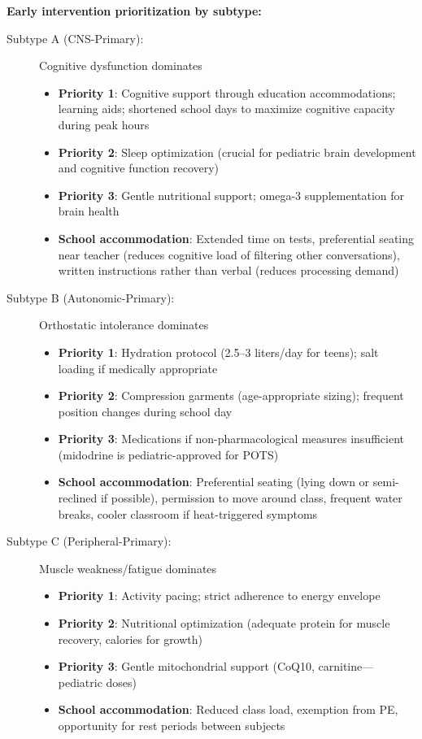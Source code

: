 \begin{recommendation}
\textbf{Early intervention prioritization by subtype:}

\begin{description}
    \item[Subtype A (CNS-Primary):] Cognitive dysfunction dominates
    \begin{itemize}
        \item \textbf{Priority 1}: Cognitive support through education accommodations; learning aids; shortened school days to maximize cognitive capacity during peak hours
        \item \textbf{Priority 2}: Sleep optimization (crucial for pediatric brain development and cognitive function recovery)
        \item \textbf{Priority 3}: Gentle nutritional support; omega-3 supplementation for brain health
        \item \textbf{School accommodation}: Extended time on tests, preferential seating near teacher (reduces cognitive load of filtering other conversations), written instructions rather than verbal (reduces processing demand)
    \end{itemize}

    \item[Subtype B (Autonomic-Primary):] Orthostatic intolerance dominates
    \begin{itemize}
        \item \textbf{Priority 1}: Hydration protocol (2.5--3 liters/day for teens); salt loading if medically appropriate
        \item \textbf{Priority 2}: Compression garments (age-appropriate sizing); frequent position changes during school day
        \item \textbf{Priority 3}: Medications if non-pharmacological measures insufficient (midodrine is pediatric-approved for POTS)
        \item \textbf{School accommodation}: Preferential seating (lying down or semi-reclined if possible), permission to move around class, frequent water breaks, cooler classroom if heat-triggered symptoms
    \end{itemize}

    \item[Subtype C (Peripheral-Primary):] Muscle weakness/fatigue dominates
    \begin{itemize}
        \item \textbf{Priority 1}: Activity pacing; strict adherence to energy envelope
        \item \textbf{Priority 2}: Nutritional optimization (adequate protein for muscle recovery, calories for growth)
        \item \textbf{Priority 3}: Gentle mitochondrial support (CoQ10, carnitine—pediatric doses)
        \item \textbf{School accommodation}: Reduced class load, exemption from PE, opportunity for rest periods between subjects
    \end{itemize}


\end{description}
\end{recommendation}
